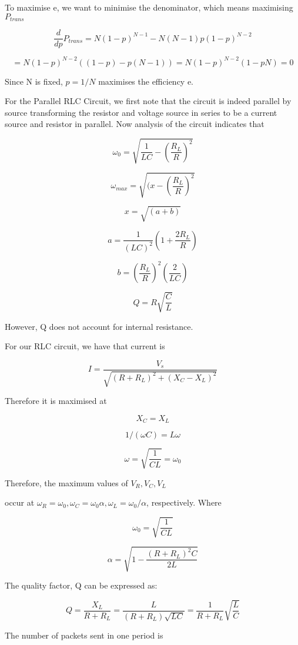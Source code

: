 \documentclass{article}
\begin{document}
To maximise e, we want to minimise the denominator, which means maximising $P_{trans}$

$$\frac{d}{dp} P_{trans} = N(1-p)^{N-1} - N(N-1)p (1-p)^{N-2} $$

$$ = N(1-p)^{N-2} ( (1-p) - p(N-1) ) = N(1-p)^{N-2} ( 1- pN ) = 0 $$ 

Since N is fixed, $p = 1/N$ maximises the efficiency e.


For the Parallel RLC Circuit, we first note that the circuit is indeed parallel by source transforming the resistor and voltage source in series to be a current source and resistor in parallel. Now analysis of the circuit indicates that

$$\omega_0 = \sqrt{\frac{1}{LC} - {(\frac{R_L}{R})}^2} $$

$$\omega_{max} = \sqrt{(x -  {(\frac{R_L}{R})}^2} $$

$$x = \sqrt{(a+b)}$$

$$a= \frac{1}{(LC)^2}(1+\frac{2R_L}{R}) $$

$$b= {(\frac{R_L}{R})}^2 (\frac{2}{LC})$$

$$Q = R \sqrt{\frac{C}{L}}$$

However, Q does not account for internal resistance. 



For our RLC circuit,  we have that current is 

$$I = \frac{V_s}{\sqrt{ (R+R_L)^2 + (X_C - X_L)^2 }}$$

Therefore it is maximised at  

$$X_C = X_L$$

$$1/(\omega C) = L\omega$$

$$\omega = \sqrt{\frac{1}{CL}} = \omega_0$$

Therefore, the maximum values of $V_R, V_C, V_L$

occur at $\omega_R = \omega_0, \omega_C = \omega_0 \alpha, \omega_L  = \omega_0 / \alpha$, respectively. Where 

$$ \omega_0 = \sqrt{\frac{1}{CL}} $$

$$\alpha = \sqrt{1 - \frac{(R+R_L)^2C}{2L} }$$

The quality factor, Q can be expressed as: 

$$Q = \frac{X_L}{R+R_L} = \frac{L}{(R+R_L)\sqrt{LC}} = \frac{1}{R+R_L}\sqrt{\frac{L}{C}}$$

 
\vspace{10cm}


The number of packets sent in one period is 
\end{document}
